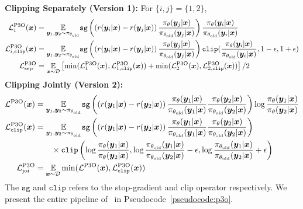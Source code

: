 \documentclass{article} %
\newcommand{\algn}{\text{P3O}}
\begin{document}
\textbf{Clipping Separately (Version 1):} For $\{i,j\}=\{1,2\}$,
{\begin{align*}
\mathcal{L}^{\algn}_i(\vx) &=  \underset{
\vy_1,\vy_2\sim\pi_{\theta_{\text{old}}}
}{\E}\texttt{sg}\left(\left(r(\vy_i|\vx)-r(\vy_j|\vx)\right)\frac{\pi_\theta(\vy_j|\vx)}{\pi_{\theta_{\text{old}}}(\vy_j|\vx)}\right)\frac{\pi_\theta(\vy_i|\vx)}{\pi_{\theta_{\text{old}}}(\vy_i|\vx)}\\
\mathcal{L}^{\algn}_{i,\texttt{clip}}(\vx) &= \underset{
\vy_1,\vy_2\sim\pi_{\theta_{\text{old}}}
}{\E}\texttt{sg}\left(\left(r(\vy_i|\vx)-r(\vy_j|\vx)\right)\frac{\pi_\theta(\vy_j|\vx)}{\pi_{\theta_{\text{old}}}(\vy_j|\vx)}\right)\texttt{clip}(\frac{\pi_\theta(\vy_i|\vx)}{\pi_{\theta_{\text{old}}}(\vy_i|\vx)}, 1-\epsilon, 1+\epsilon)\\
\mathcal{L}^{\algn}_{\text{sep}} &= \underset{\vx\sim\mathcal{D}}{\E}\left[\min(\mathcal{L}^{\algn}_1(\vx), \mathcal{L}^{\algn}_{1,\texttt{clip}}(\vx)) + \min(\mathcal{L}^{\algn}_2(\vx), \mathcal{L}^{\algn}_{2,\texttt{clip}}(\vx))\right]/2
\end{align*}}
\normalsize
\textbf{Clipping Jointly (Version 2):}
{\begin{align*}
\mathcal{L}^{\algn}(\vx) &=  \underset{
\vy_1,\vy_2\sim\pi_{\theta_{\text{old}}}
}{\E}\texttt{sg}\left(\left(r(\vy_1|\vx)-r(\vy_2|\vx)\right)\frac{\pi_\theta(\vy_1|\vx)}{\pi_{\theta_{\text{old}}}(\vy_1|\vx)}\frac{\pi_\theta(\vy_2|\vx)}{\pi_{\theta_{\text{old}}}(\vy_2|\vx)}\right)\log\frac{\pi_\theta(\vy_1|\vx)}{\pi_\theta(\vy_2|\vx)}\\
\mathcal{L}^{\algn}_{\texttt{clip}}(\vx) &= \underset{
\vy_1,\vy_2\sim\pi_{\theta_{\text{old}}}
}{\E}\texttt{sg}\left(\left(r(\vy_1|\vx)-r(\vy_2|\vx)\right)\frac{\pi_\theta(\vy_1|\vx)}{\pi_{\theta_{\text{old}}}(\vy_1|\vx)}\frac{\pi_\theta(\vy_2|\vx)}{\pi_{\theta_{\text{old}}}(\vy_2|\vx)}\right) \\
&\quad\quad\times\texttt{clip}\left(\log\frac{\pi_\theta(\vy_1|\vx)}{\pi_\theta(\vy_2|\vx)},\log\frac{\pi_{\theta_\text{old}}(\vy_1|\vx)}{\pi_{\theta_\text{old}}(\vy_2|\vx)}-\epsilon,\log\frac{\pi_{\theta_\text{old}}(\vy_1|\vx)}{\pi_{\theta_\text{old}}(\vy_2|\vx)}+\epsilon\right)\\
\mathcal{L}^{\algn}_{\text{joi}} &= \underset{\vx\sim\mathcal{D}}{\E}\min(\mathcal{L}^{\algn}(\vx), \mathcal{L}^{\algn}_{\texttt{clip}}(\vx))
\end{align*}}
\normalsize
The $\texttt{sg}$ and $\texttt{clip}$ refers to the stop-gradient and clip operator respectively. We present the entire pipeline of \algn\ in Pseudocode~\ref{pseudocode:p3o}.
\end{document}
